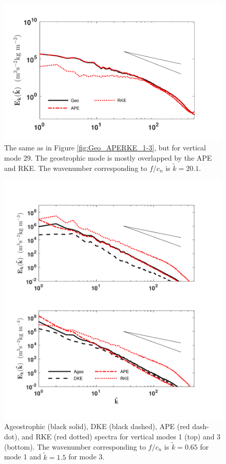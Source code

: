 \begin{figure}[H]
\includegraphics[scale=1]{Chapter4/img/Geo_APERKE_29}
\caption{The same as in Figure \ref{fig:Geo_APERKE_1-3}, but for vertical mode 29. The geostrophic mode is mostly overlapped by the APE and RKE.  The wavenumber corresponding to $f/c_n$ is $\tilde{k} = 20.1$.}
\label{fig:Geo_APERKE_29}
\end{figure}
\begin{figure}[H]
\includegraphics[scale=1]{Chapter4/img/Ageo_APEDKE_1-3}
\caption{Ageostrophic (black solid), DKE (black dashed), APE (red dash-dot), and RKE (red dotted) spectra for vertical modes 1 (top) and 3 (bottom). The wavenumber corresponding to $f/c_n$ is $\tilde{k} = 0.65$ for mode 1 and $\tilde{k} = 1.5$ for mode 3.}
\label{fig:Ageo_APEDKE_1-3}
\end{figure}

